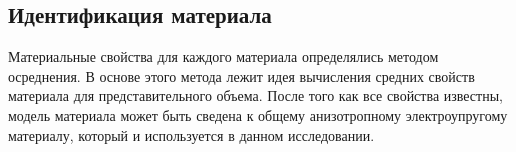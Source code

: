 %


\subsection{Идентификация материала}

Материальные свойства для каждого материала определялись методом осреднения\cite{b:6}. В основе этого метода лежит идея вычисления средних свойств материала для представительного объема. После того как все свойства известны, модель материала может быть сведена к общему анизотропному электроупругому материалу, который и используется в данном исследовании.



